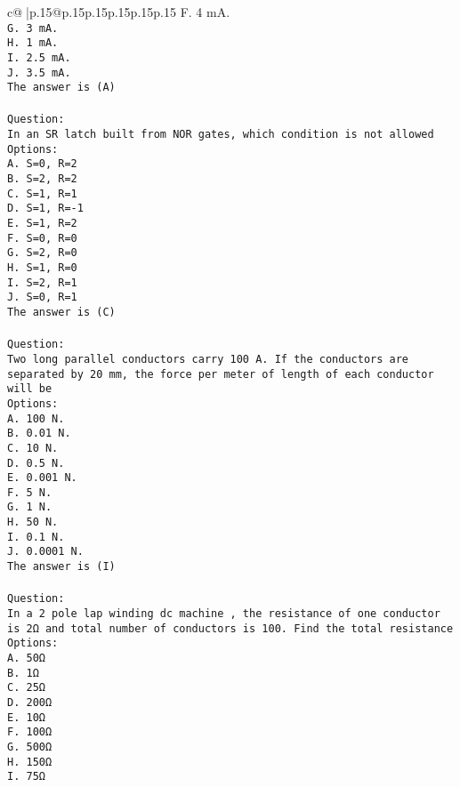 \documentclass{article}
\begin{document}
{\begin{supertabular}{c@{$\;$}|p{.15\linewidth}@{}p{.15\linewidth}p{.15\linewidth}p{.15\linewidth}p{.15\linewidth}p{.15\linewidth}}
{{{F. 4 mA.\\ \tt G. 3 mA.\\ \tt H. 1 mA.\\ \tt I. 2.5 mA.\\ \tt J. 3.5 mA.\\ \tt The answer is (A)\\ \tt \\ \tt Question:\\ \tt In an SR latch built from NOR gates, which condition is not allowed\\ \tt Options:\\ \tt A. S=0, R=2\\ \tt B. S=2, R=2\\ \tt C. S=1, R=1\\ \tt D. S=1, R=-1\\ \tt E. S=1, R=2\\ \tt F. S=0, R=0\\ \tt G. S=2, R=0\\ \tt H. S=1, R=0\\ \tt I. S=2, R=1\\ \tt J. S=0, R=1\\ \tt The answer is (C)\\ \tt \\ \tt Question:\\ \tt Two long parallel conductors carry 100 A. If the conductors are separated by 20 mm, the force per meter of length of each conductor will be\\ \tt Options:\\ \tt A. 100 N.\\ \tt B. 0.01 N.\\ \tt C. 10 N.\\ \tt D. 0.5 N.\\ \tt E. 0.001 N.\\ \tt F. 5 N.\\ \tt G. 1 N.\\ \tt H. 50 N.\\ \tt I. 0.1 N.\\ \tt J. 0.0001 N.\\ \tt The answer is (I)\\ \tt \\ \tt Question:\\ \tt In a 2 pole lap winding dc machine , the resistance of one conductor is 2Ω and total number of conductors is 100. Find the total resistance\\ \tt Options:\\ \tt A. 50Ω\\ \tt B. 1Ω\\ \tt C. 25Ω\\ \tt D. 200Ω\\ \tt E. 10Ω\\ \tt F. 100Ω\\ \tt G. 500Ω\\ \tt H. 150Ω\\ \tt I. 75Ω\\ \tt }}}
\end{supertabular}}
\end{document}
